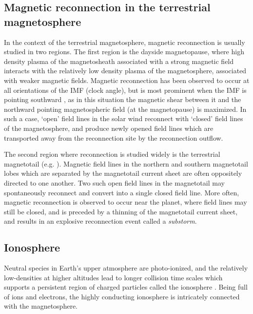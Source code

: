 \subsection{Magnetic reconnection in the terrestrial magnetosphere}
In the context of the terrestrial magnetosphere, magnetic reconnection is usually studied in two regions. The first region is the dayside magnetopause, where high density plasma of the magnetosheath associated with a strong magnetic field interacts with the relatively low density plasma of the magnetosphere, associated with weaker magnetic fields. Magnetic reconnection has been observed to occur at all orientations of the IMF (clock angle), but is most prominent when the IMF is pointing southward \cite{Swisdak2003DiamagneticMagnetopause}, as in this situation the magnetic shear between it and the northward pointing magnetospheric field (at the magnetopause) is maximized. In such a case, `open' field lines in the solar wind reconnect with `closed' field lines of the magnetosphere, and produce newly opened field lines which are transported away from the reconnection site by the reconnection outflow.

The second region where reconnection is studied widely is the terrestrial magnetotail (e.g. ). Magnetic field lines in the northern and southern magnetotail lobes which are separated by the magnetotail current sheet are often oppositely directed to one another. Two such open field lines in the magnetotail may spontaneously reconnect and convert into a single closed field line. More often, magnetic reconnection is observed to occur near the planet, where field lines may still be closed, and is preceded by a thinning of the magnetotail current sheet, and results in an explosive reconnection event called a \emph{substorm}. 

\subsection{Ionosphere}
Neutral species in Earth's upper atmosphere are photo-ionized, and the relatively low-densities at higher altitudes lead to longer collision time scales which supports a persistent region of charged particles called the ionosphere \cite{Schunk2009Ionospheres}. Being full of ions and electrons, the highly conducting ionosphere is intricately connected with the magnetosphere.

